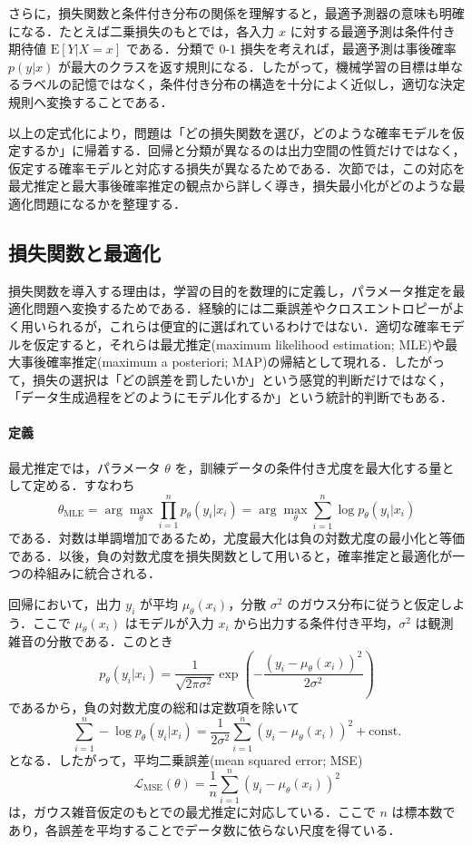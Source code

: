 さらに，損失関数と条件付き分布の関係を理解すると，最適予測器の意味も明確になる．たとえば二乗損失のもとでは，各入力 $x$ に対する最適予測は条件付き期待値 $\mathrm{E}[Y|X=x]$ である．分類で $0$-$1$ 損失を考えれば，最適予測は事後確率 $p(y|x)$ が最大のクラスを返す規則になる．したがって，機械学習の目標は単なるラベルの記憶ではなく，条件付き分布の構造を十分によく近似し，適切な決定規則へ変換することである．

以上の定式化により，問題は「どの損失関数を選び，どのような確率モデルを仮定するか」に帰着する．回帰と分類が異なるのは出力空間の性質だけではなく，仮定する確率モデルと対応する損失が異なるためである．次節では，この対応を最尤推定と最大事後確率推定の観点から詳しく導き，損失最小化がどのような最適化問題になるかを整理する．

\subsection{損失関数と最適化}
損失関数を導入する理由は，学習の目的を数理的に定義し，パラメータ推定を最適化問題へ変換するためである．経験的には二乗誤差やクロスエントロピーがよく用いられるが，これらは便宜的に選ばれているわけではない．適切な確率モデルを仮定すると，それらは最尤推定(maximum likelihood estimation; MLE)や最大事後確率推定(maximum a posteriori; MAP)の帰結として現れる．したがって，損失の選択は「どの誤差を罰したいか」という感覚的判断だけではなく，「データ生成過程をどのようにモデル化するか」という統計的判断でもある．

\paragraph*{定義}
最尤推定では，パラメータ $\theta$ を，訓練データの条件付き尤度を最大化する量として定める．すなわち
\[
\hat\theta_{\mathrm{MLE}}
= \arg\max_\theta \prod_{i=1}^n p_\theta(y_i|x_i)
= \arg\max_\theta \sum_{i=1}^n \log p_\theta(y_i|x_i)
\]
である．対数は単調増加であるため，尤度最大化は負の対数尤度の最小化と等価である．以後，負の対数尤度を損失関数として用いると，確率推定と最適化が一つの枠組みに統合される．

回帰において，出力 $y_i$ が平均 $\mu_\theta(x_i)$，分散 $\sigma^2$ のガウス分布に従うと仮定しよう．ここで $\mu_\theta(x_i)$ はモデルが入力 $x_i$ から出力する条件付き平均，$\sigma^2$ は観測雑音の分散である．このとき
\[
p_\theta(y_i|x_i)
= \frac{1}{\sqrt{2\pi\sigma^2}}
\exp\left(
-\frac{(y_i-\mu_\theta(x_i))^2}{2\sigma^2}
\right)
\]
であるから，負の対数尤度の総和は定数項を除いて
\[
\sum_{i=1}^n -\log p_\theta(y_i|x_i)
= \frac{1}{2\sigma^2}\sum_{i=1}^n(y_i-\mu_\theta(x_i))^2 + \mathrm{const.}
\]
となる．したがって，平均二乗誤差(mean squared error; MSE)
\[
\mathcal L_{\mathrm{MSE}}(\theta)
= \frac{1}{n}\sum_{i=1}^n(y_i-\mu_\theta(x_i))^2
\]
は，ガウス雑音仮定のもとでの最尤推定に対応している．ここで $n$ は標本数であり，各誤差を平均することでデータ数に依らない尺度を得ている．

